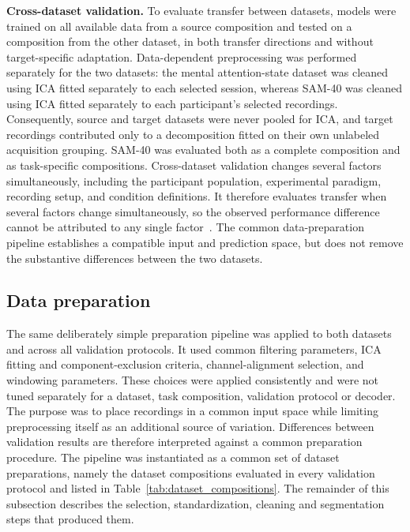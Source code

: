 \documentclass[10pt,letterpaper]{article}
\newcommand{\rev}[1]{#1}
\begin{document}
\textbf{Cross-dataset validation.}
\rev{To evaluate transfer between datasets, models were trained on all available data from a source composition and tested on a composition from the other dataset, in both transfer directions and without target-specific adaptation. Data-dependent preprocessing was performed separately for the two datasets: the mental attention-state dataset was cleaned using ICA fitted separately to each selected session, whereas SAM-40 was cleaned using ICA fitted separately to each participant's selected recordings. Consequently, source and target datasets were never pooled for ICA, and target recordings contributed only to a decomposition fitted on their own unlabeled acquisition grouping. SAM-40 was evaluated both as a complete composition and as task-specific compositions. Cross-dataset validation changes several factors simultaneously, including the participant population, experimental paradigm, recording setup, and condition definitions. It therefore evaluates transfer when several factors change simultaneously, so the observed performance difference cannot be attributed to any single factor~\cite{lan2019domain}. The common data-preparation pipeline establishes a compatible input and prediction space, but does not remove the substantive differences between the two datasets.}

\subsection*{Data preparation}

\rev{The same deliberately simple preparation pipeline was applied to
both datasets and across all validation protocols. It used common filtering
parameters, ICA fitting and component-exclusion criteria, channel-alignment
selection, and windowing parameters. These choices were applied consistently and were not tuned
separately for a dataset, task composition, validation protocol or decoder. The
purpose was to place recordings in a common input space while limiting
preprocessing itself as an additional source of variation. Differences between
validation results are therefore interpreted against a common preparation
procedure. The pipeline was instantiated as a common set of dataset
preparations, namely the dataset compositions evaluated in every validation
protocol and listed in
Table~\ref{tab:dataset_compositions}. The remainder of this subsection
describes the selection, standardization, cleaning and segmentation steps that
produced them.}


\end{document}
